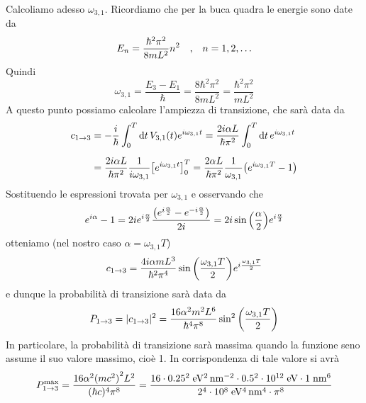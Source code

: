 \begin{soluzione}
   Calcoliamo adesso $\omega_{3,1}$. Ricordiamo che per la buca quadra le energie sono date da
   \begin{equation*}
      E_n
      =\frac{\hbar^2 \pi^2}{8 m L^2} n^2
      \qq{,}
      n=1,2,\ldots
   \end{equation*}
   Quindi
   \begin{equation*}
      \omega_{3,1}
      =\frac{E_3-E_1}{\hbar}
      =\frac{8 \hbar^2 \pi^2}{8 m L^2}
      =\frac{\hbar^2 \pi^2}{m L^2}
   \end{equation*}
   A questo punto possiamo calcolare l'ampiezza di transizione, che sarà data da
   \begin{equation*}
      \begin{split}
         c_{1 \to 3}
         & =-\frac{i}{\hbar} \int_{0}^{T} \dd{t} V_{3,1}(t) e^{i \omega_{3,1} t}
         =\frac{2 i \alpha L}{\hbar \pi^2} \int_{0}^{T} \dd{t} e^{i \omega_{3,1} t}
         \\[0.2cm]
         & =\frac{2 i \alpha L}{\hbar \pi^2} \frac{1}{i \omega_{3,1}} \qty[ e^{i \omega_{3,1} t} ]_{0}^{T}
         =\frac{2 \alpha L}{\hbar \pi^2} \frac{1}{\omega_{3,1}} \qty( e^{i \omega_{3,1} T} - 1 )
      \end{split}
   \end{equation*}
   Sostituendo le espressioni trovata per $\omega_{3,1}$ e osservando che
   \begin{equation*}
      e^{i\alpha} - 1
      =2i e^{i \frac{\alpha}{2}} \frac{\qty( e^{i \frac{\alpha}{2}} - e^{-i \frac{\alpha}{2}} )}{2i}
      =2i \sin{ \qty( \frac{\alpha}{2} )} e^{i \frac{\alpha}{2}}
   \end{equation*}
   otteniamo (nel nostro caso $\alpha=\omega_{3,1}T$)
   \begin{equation*}
      c_{1 \to 3}
      =\frac{4 i \alpha m L^3}{\hbar^2 \pi^4} \sin{ \qty( \frac{\omega_{3,1} T}{2} )} e^{i \frac{\omega_{3,1} T}{2}}
   \end{equation*}
   e dunque la probabilità di transizione sarà data da
   \begin{equation*}
      P_{1 \to 3}
      =|c_{1 \to 3}|^2
      =\frac{16 \alpha^2 m^2 L^6}{\hbar^4 \pi^8} \sin^2{ \qty( \frac{\omega_{3,1} T}{2} )}
   \end{equation*}
   In particolare, la probabilità di transizione sarà massima quando la funzione seno assume il suo valore massimo, cioè 1. In corrispondenza di tale valore si avrà
   \begin{equation*}
      P_{1 \to 3}^{\rm max}
      =\frac{16 \alpha^2 {(mc^2)}^2 L^2}{(\hbar c)^4 \pi^8}
      =\rm \frac{16 \cdot 0.25^2 \; eV^2 \, nm^{-2} \cdot 0.5^2 \cdot 10^{12} \; eV \cdot 1 \; nm^6}{2^4 \cdot 10^8 \; eV^4 \, nm^4 \cdot \pi^8}
   \end{equation*}
\end{soluzione}